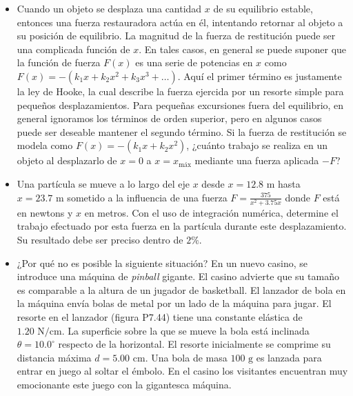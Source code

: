 \documentclass[11pt,a4paper]{article}
\begin{document}
\newpage

\begin{itemize}
    \item[\textbf{42.}] Cuando un objeto se desplaza una cantidad $x$ de su equilibrio estable, entonces una fuerza restauradora actúa en él, intentando retornar al objeto a su posición de equilibrio. La magnitud de la fuerza de restitución puede ser una complicada función de $x$. En tales casos, en general se puede suponer que la función de fuerza $F(x)$ es una serie de potencias en $x$ como $F(x) = -(k_1x + k_2x^2 + k_3x^3 + \dots)$. Aquí el primer término es justamente la ley de Hooke, la cual describe la fuerza ejercida por un resorte simple para pequeños desplazamientos. Para pequeñas excursiones fuera del equilibrio, en general ignoramos los términos de orden superior, pero en algunos casos puede ser deseable mantener el segundo término. Si la fuerza de restitución se modela como $F(x) = -(k_1x + k_2x^2)$, ¿cuánto trabajo se realiza en un objeto al desplazarlo de $x = 0$ a $x = x_{\text{máx}}$ mediante una fuerza aplicada $-F$?
    \vspace*{6cm}

    \item[\textbf{43.}] Una partícula se mueve a lo largo del eje $x$ desde $x = 12.8 \text{ m}$ hasta $x = 23.7 \text{ m}$ sometido a la influencia de una fuerza $F = \frac{375}{x^2 + 3.75x}$ donde $F$ está en newtons y $x$ en metros. Con el uso de integración numérica, determine el trabajo efectuado por esta fuerza en la partícula durante este desplazamiento. Su resultado debe ser preciso dentro de $2\%$.
    \vspace*{6cm}

    \item[\textbf{44.}] ¿Por qué no es posible la siguiente situación? En un nuevo casino, se introduce una máquina de \textit{pinball} gigante. El casino advierte que su tamaño es comparable a la altura de un jugador de basketball. El lanzador de bola en la máquina envía bolas de metal por un lado de la máquina para jugar. El resorte en el lanzador (figura P7.44) tiene una constante elástica de $1.20 \text{ N/cm}$. La superficie sobre la que se mueve la bola está inclinada $\theta = 10.0^\circ$ respecto de la horizontal. El resorte inicialmente se comprime su distancia máxima $d = 5.00 \text{ cm}$. Una bola de masa $100 \text{ g}$ es lanzada para entrar en juego al soltar el émbolo. En el casino los visitantes encuentran muy emocionante este juego con la gigantesca máquina.
    \vspace*{6cm}


\end{itemize}
\end{document}
